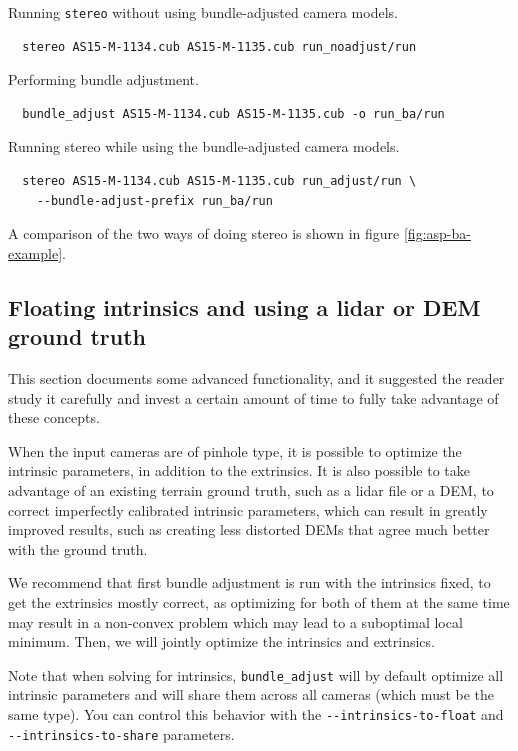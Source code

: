 Running \texttt{stereo} without using bundle-adjusted camera models.
\begin{verbatim}
  stereo AS15-M-1134.cub AS15-M-1135.cub run_noadjust/run
\end{verbatim}

Performing bundle adjustment.
\begin{verbatim}
  bundle_adjust AS15-M-1134.cub AS15-M-1135.cub -o run_ba/run
\end{verbatim}

Running stereo while using the bundle-adjusted camera models.
\begin{verbatim}
  stereo AS15-M-1134.cub AS15-M-1135.cub run_adjust/run \
    --bundle-adjust-prefix run_ba/run
\end{verbatim}

A comparison of the two ways of doing stereo is shown in figure \ref{fig:asp-ba-example}.

\subsection{Floating intrinsics and using a lidar or DEM ground truth}
\label{floatingintrinsics}

This section documents some advanced functionality, and it suggested the
reader study it carefully and invest a certain amount of time to fully
take advantage of these concepts.

When the input cameras are of pinhole type, it is possible to optimize
the intrinsic parameters, in addition to the extrinsics. It is also
possible to take advantage of an existing terrain ground truth, such as a lidar file or a DEM,
to correct imperfectly calibrated intrinsic parameters, which can result in greatly
improved results, such as creating less distorted DEMs that agree much better
with the ground truth. 

We recommend that first bundle adjustment is run with the intrinsics fixed,
to get the extrinsics mostly correct, as optimizing for both of them at
the same time may result in a non-convex problem which may lead to a 
suboptimal local minimum. Then, we will jointly optimize the intrinsics
and extrinsics. 

Note that when solving for intrinsics, \texttt{bundle\_adjust} will by default
optimize all intrinsic parameters and will share them across all cameras (which must
be the same type).  You can control this behavior with the 
\texttt{-\/-intrinsics-to-float} and \texttt{-\/-intrinsics-to-share} parameters.

